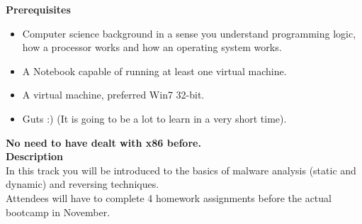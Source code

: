 \def\abstracttitle{Introduction to x86 RE}
\def\abstractcomment{Track 1 [Beginners]}
\def\abstractowner{Mari0n}

\thispagestyle{abstract}

  \textbf{Prerequisites}
  \begin{itemize}
  	\item Computer science background in a sense you understand programming logic, how a processor works and how an operating system works.
  	\item A Notebook capable of running at least one virtual machine.
  	\item A virtual machine, preferred Win7 32-bit.
  	\item Guts :) (It is going to be a lot to learn in a very short time).
  \end{itemize}

  \textbf{No need to have dealt with x86 before.}\\

  \textbf{Description}\\

  In this track you will be introduced to the basics of malware analysis (static and dynamic) and reversing techniques.\\

  Attendees will have to complete 4 homework assignments before the actual bootcamp in November.\\
